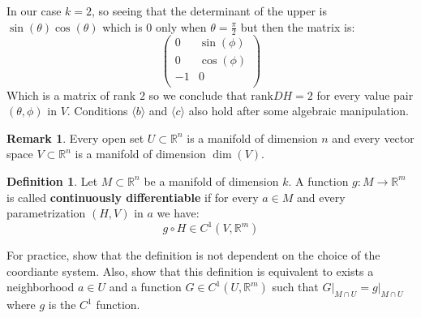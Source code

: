 \documentclass[11pt,a4paper]{article}
\theoremstyle{definition}
\newtheorem{definition}{Definition}[section]
\newtheorem{remark}{Remark}[section]
\theoremstyle{plain}
\newcommand{\R}{\mathbb{R}}
\begin{document}
	In our case $k = 2$, so seeing that the determinant of the upper
	is $\sin(\theta)\cos(\theta)$ which is $0$ only when 
	$\theta = \frac{\pi}{2}$ but then the matrix is:
	\[
		\begin{pmatrix}
		0 & \sin(\phi)\\
		0 & \cos(\phi)\\
		-1 & 0\\
		\end{pmatrix}
	\]
	Which is a matrix of rank $2$ so we conclude that $\mathrm{rank}DH = 2$
	for every value pair $(\theta,\phi)$ in $V$. Conditions 
	$\langle b \rangle$ and $\langle c \rangle$ also hold after some
	algebraic manipulation.
	\begin{remark}
		Every open set $U \subset \R^n$ is a manifold of dimension $n$
		and every vector space $V \subset \R^n$ is a manifold of dimension 
		$\dim(V)$.
	\end{remark}
	
	\begin{definition}
		Let $M \subset \R^n$ be a manifold of dimension $k$. A function
		$g \colon M \to \R^m$ is called \textbf{continuously differentiable}
		if for every $a \in M$ and every parametrization $(H,V)$ in $a$
		we have:
		\[
			g \circ H \in C^1(V, \R^m)
		\]
	\end{definition}
	\noindent
	For practice, show that the definition is not dependent on the choice of 
	the coordiante system. Also, show that this definition is equivalent to 
	exists a neighborhood $a \in U$ and a function $G \in C^1(U,\R^m)$ such 
	that  $G \vert_{M \cap U} = g \vert_{M \cap U}$ where $g$ is the $C^1$ 
	function.
	
	\newpage
	
\end{document}
